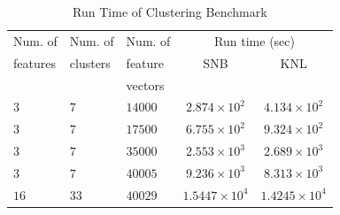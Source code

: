\begin{table}
  \caption{Run Time of Clustering Benchmark}
  \label{tab:clusterResults}
  \begin{tabular}{lllcc}
    \toprule
    Num. of   & Num. of   & Num. of & \multicolumn{2}{c}{Run time (sec)}\\
    features  & clusters  & feature           & SNB & KNL\\
              &           & vectors           & &\\
    \midrule
    $3$ & $7$ & $14000$ & $2.874\times 10^{2}$ & $4.134\times 10^{2}$ \\
    $3$ & $7$ & $17500$ & $6.755\times 10^{2}$ & $9.324\times 10^{2}$ \\
    $3$ & $7$ & $35000$ & $2.553\times 10^{3}$ & $2.689\times 10^{3}$ \\
    $3$ & $7$ & $40005$ & $9.236\times 10^{3}$ & $8.313\times 10^{3}$ \\
    $16$ & $33$ & $40029$ & $1.5447\times 10^{4}$ & $1.4245\times 10^{4}$ \\
    \bottomrule
  \end{tabular}
\end{table}


